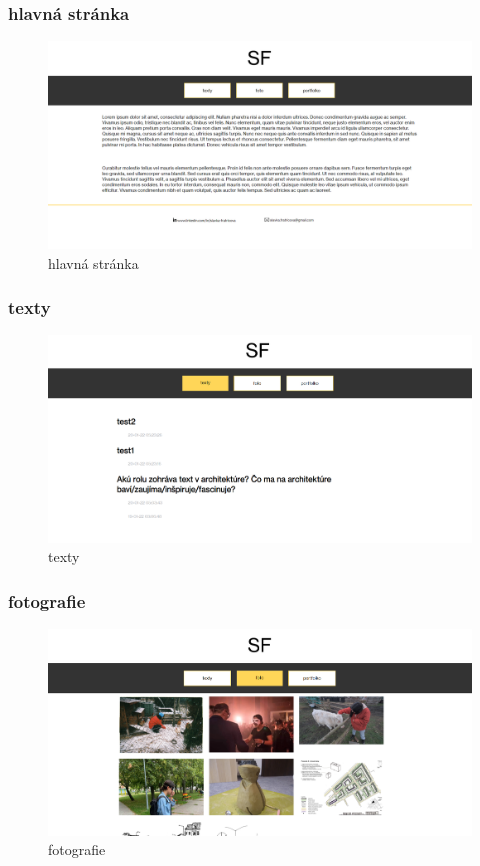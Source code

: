 
\label{hlavná stránka}
\begin{frame}\frametitle{hlavná stránka}
  \begin{figure}[htb]
    \centering
    \includegraphics[scale=0.3]{uvodka.png}
    \caption{hlavná stránka}
  \end{figure}

\end{frame}


\begin{frame}\frametitle{texty}
  \begin{figure}[htb]
    \centering
    \includegraphics[scale=0.3]{texty_bez_text.png}
    \caption{texty}
  \end{figure}

\end{frame}


\begin{frame}\frametitle{fotografie}
  \begin{figure}[htb]
    \centering
    \includegraphics[scale=0.3]{galeria.png}
    \caption{fotografie}
  \end{figure}

\end{frame}


